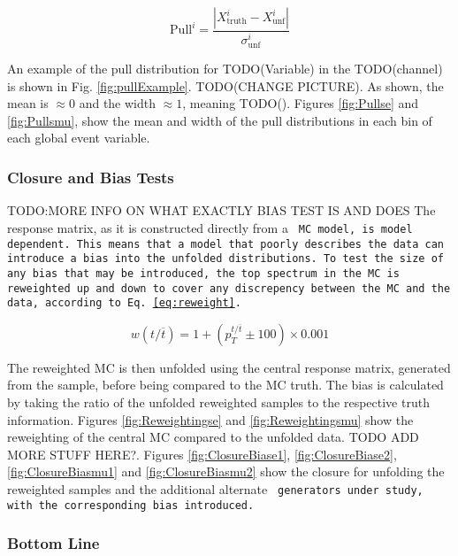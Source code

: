 	\begin{equation}
	\label{eq:pull}
	\text{Pull}^{i}=\frac{|X^{i}_{\text{truth}}-X^{i}_{\text{unf}}|}{\sigma^{i}_{\text{unf}}}
	\end{equation}

	An example of the pull distribution for TODO(Variable) in the TODO(channel) is shown in Fig. \ref{fig:pullExample}. TODO(CHANGE PICTURE). As shown, the mean is $\approx0$ and the width $\approx1$, meaning TODO(). Figures \ref{fig:Pullse} and \ref{fig:Pullsmu}, show the mean and width of the pull distributions in each bin of each global event variable.
	
	

\subsubsection{Closure and Bias Tests}
\label{sssec:bias}
	TODO:MORE INFO ON WHAT EXACTLY BIAS TEST IS AND DOES
	The response matrix, as it is constructed directly from a \tt{} MC model, is model dependent. This means that a model that poorly describes the data can introduce a bias into the unfolded distributions. To test the size of any bias that may be introduced, the top \pt{} spectrum in the \PowhegPythia{} MC is reweighted up and down to cover any discrepency between the \PowhegPythia{} MC and the data, according to Eq. \ref{eq:reweight}.

	\begin{equation}
	\label{eq:reweight}
	w(t/\overline{t})=1+(p_{T}^{t/\overline{t}} \pm 100) \times 0.001
	\end{equation}

	The reweighted MC is then unfolded using the central response matrix, generated from the \PowhegPythia{} sample, before being compared to the MC truth. The bias is calculated by taking the ratio of the unfolded reweighted samples to the respective truth information. Figures \ref{fig:Reweightingse} and \ref{fig:Reweightingsmu} show the reweighting of the central \PowhegPythia{} MC compared to the unfolded data. TODO ADD MORE STUFF HERE?. Figures \ref{fig:ClosureBiase1}, \ref{fig:ClosureBiase2}, \ref{fig:ClosureBiasmu1} and \ref{fig:ClosureBiasmu2} show the closure for unfolding the reweighted samples and the additional alternate \tt{} generators under study, with the corresponding bias introduced.

	
	

\subsubsection{Bottom Line}
\label{sssec:bline}